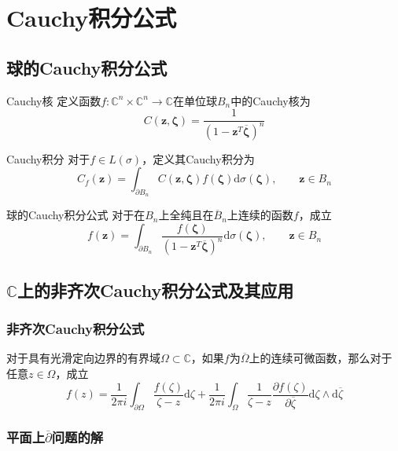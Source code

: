 \documentclass[lang = cn, scheme = chinese, thmcnt = section]{elegantbook}
\newcommand{\C}{\mathbb{C}}  		   %
\newcommand{\sub}{\subset}             %
\newcommand{\bs}{\boldsymbol}          %
\newcommand{\dd}{\mathrm{d}}           %
\begin{document}
\chapter{Cauchy积分公式}

\section{球的Cauchy积分公式}

\begin{definition}{Cauchy核}
	定义函数$f:\C^n\times\C^n\to \C$在单位球$B_n$中的Cauchy核为%
	$$
	C(\bs{z},\bs{\zeta})=\frac{1}{(1-\bs{z}^T\overline{\bs{\zeta}})^n}
	$$
\end{definition}

\begin{definition}{Cauchy积分}
	对于$f\in L(\sigma)$，定义其Cauchy积分为%
	$$
	C_f(\bs{z})=\int_{\partial B_n}C(\bs{z},\bs{\zeta})f(\bs{\zeta})\dd \sigma(\bs{\zeta}),\qquad \bs{z}\in B_n
	$$
\end{definition}

\begin{theorem}{球的Cauchy积分公式}
	对于在$B_n$上全纯且在$\overline{B}_n$上连续的函数$f$，成立%
	$$
	f(\bs{z})=\int_{\partial B_n}\frac{f(\bs{\zeta})}{(1-\bs{z}^T\overline{\bs{\zeta}})^n}\dd \sigma(\bs{\zeta}),\qquad \bs{z}\in B_n
	$$
\end{theorem}

\section{$\C$上的非齐次Cauchy积分公式及其应用}

\subsection{非齐次Cauchy积分公式}

\begin{theorem}
	对于具有光滑定向边界的有界域$\Omega\sub\C$，如果$f$为$\overline{\Omega}$上的连续可微函数，那么对于任意$z\in\Omega$，成立%
	$$
	f(z)=\frac{1}{2\pi i}\int_{\partial\Omega}\frac{f(\zeta)}{\zeta-z}\dd\zeta+\frac{1}{2\pi i}\int_{\Omega}\frac{1}{\zeta-z}\frac{\partial f(\zeta)}{\partial \overline{\zeta}}\dd\zeta\wedge\dd\overline{\zeta}
	$$
\end{theorem}

\subsection{平面上$\overline{\partial}$问题的解}
\end{document}
